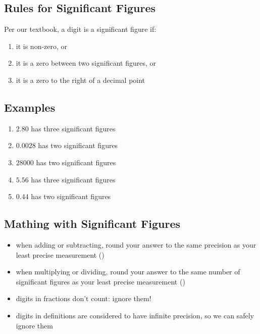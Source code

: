 \documentclass[11pt, oneside]{article}   	%
\begin{document}
\subsection{Rules for Significant Figures}
Per our textbook\cite[p. 21]{wile-chem-2}, a digit is a significant figure if:
\begin{enumerate}
\item it is non-zero, or
\item it is a zero between two significant figures, or
\item it is a zero to the right of a decimal point
\end{enumerate}

\subsection{Examples}
\begin{enumerate}[label=Example \arabic*]
\item $2.80$ has three significant figures
\item $0.0028$ has two significant figures
\item $28000$ has two significant figures
\item $5.56$ has three significant figures
\item $0.44$ has two significant figures
\end{enumerate}


\subsection{Mathing with Significant Figures}
\begin{itemize}
\item when adding or subtracting, round your answer to the same precision as your least precise measurement (\cite[p. 25]{wile-chem-2})
\item when multiplying or dividing, round your answer to the same number of significant figures as your least precise measurement (\cite[p. 26]{wile-chem-2})
\item digits in fractions don't count: ignore them!
\item digits in definitions are considered to have infinite precision, so we can safely ignore them
\end{itemize}
\end{document}
